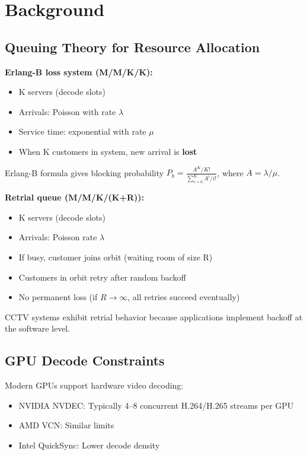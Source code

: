 \documentclass[sigconf,review]{acmart}
\begin{document}
\section{Background}

\subsection{Queuing Theory for Resource Allocation}

\textbf{Erlang-B loss system (M/M/K/K):}
\begin{itemize}
  \item K servers (decode slots)
  \item Arrivals: Poisson with rate $\lambda$
  \item Service time: exponential with rate $\mu$
  \item When K customers in system, new arrival is \textbf{lost}
\end{itemize}

Erlang-B formula gives blocking probability $P_b = \frac{A^K / K!}{\sum_{i=0}^{K} A^i / i!}$, where $A = \lambda / \mu$.

\textbf{Retrial queue (M/M/K/(K+R)):}
\begin{itemize}
  \item K servers (decode slots)
  \item Arrivals: Poisson rate $\lambda$
  \item If busy, customer joins orbit (waiting room of size R)
  \item Customers in orbit retry after random backoff
  \item No permanent loss (if $R \to \infty$, all retries succeed eventually)
\end{itemize}

CCTV systems exhibit retrial behavior because applications implement backoff at the software level.

\subsection{GPU Decode Constraints}

Modern GPUs support hardware video decoding:
\begin{itemize}
  \item NVIDIA NVDEC: Typically 4–8 concurrent H.264/H.265 streams per GPU
  \item AMD VCN: Similar limits
  \item Intel QuickSync: Lower decode density
\end{itemize}
\end{document}
